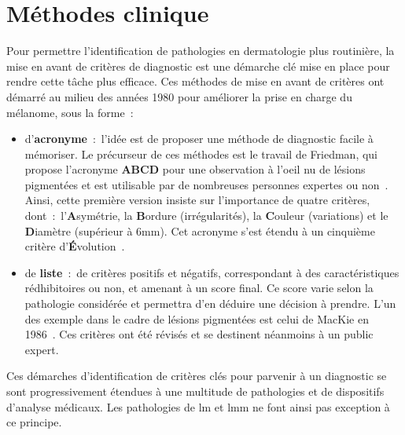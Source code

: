 \section{Méthodes clinique}
\label{sec:clinical_methods}
Pour permettre l'identification de pathologies en dermatologie plus routinière, la mise en avant de critères de diagnostic est une démarche clé mise en place pour rendre cette tâche plus efficace. Ces méthodes de mise en avant de critères ont démarré au milieu des années 1980 pour améliorer la prise en charge du mélanome, sous la forme~:
\begin{itemize}
    \item d'\textbf{acronyme}~:~l'idée est de proposer une méthode de diagnostic facile à mémoriser. Le précurseur de ces méthodes est le travail de Friedman, qui propose l'acronyme \textbf{ABCD} pour une observation à l'oeil nu de lésions pigmentées et est utilisable par de nombreuses personnes expertes ou non~\cite{Friedman1985}. Ainsi, cette première version insiste sur l'importance de quatre critères, dont~:~l'\textbf{A}symétrie, la \textbf{B}ordure (irrégularités), la \textbf{C}ouleur (variations) et le \textbf{D}iamètre (supérieur à 6mm). Cet acronyme s'est étendu à un cinquième critère d'\textbf{É}volution~\cite{Abbasi2004}.
    \item de \textbf{liste}~:~de critères positifs et négatifs, correspondant à des caractéristiques rédhibitoires ou non, et amenant à un score final. Ce score varie selon la pathologie considérée et permettra d'en déduire une décision à prendre. L'un des exemple dans le cadre de lésions pigmentées est celui de MacKie en 1986~\cite{mackie1986}. Ces critères ont été révisés et se destinent néanmoins à un public expert. 
\end{itemize}\par

Ces démarches d'identification de critères clés pour parvenir à un diagnostic se sont progressivement étendues à une multitude de pathologies et de dispositifs d'analyse médicaux. Les pathologies de \gls{lm} et \gls{lmm} ne font ainsi pas exception à ce principe.

